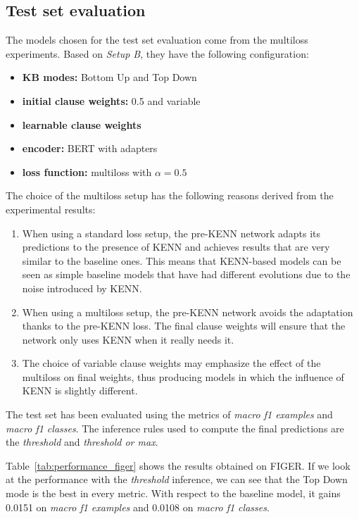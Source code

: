 \subsection{Test set evaluation} \label{test_evaluation}
The models chosen for the test set evaluation come from the multiloss experiments. Based on \textit{Setup B}, they have the following configuration:
\begin{itemize}
    \item \textbf{KB modes:} Bottom Up and Top Down
    \item \textbf{initial clause weights:} 0.5 and variable
    \item \textbf{learnable clause weights}
    \item \textbf{encoder:} BERT with adapters
    \item \textbf{loss function:} multiloss with $\alpha = 0.5$
\end{itemize}
The choice of the multiloss setup has the following reasons derived from the experimental results:
\begin{enumerate}
    \item When using a standard loss setup, the pre-KENN network adapts its predictions to the presence of KENN and achieves results that are very similar to the baseline ones. This means that KENN-based models can be seen as simple baseline models that have had different evolutions due to the noise introduced by KENN.
    \item When using a multiloss setup, the pre-KENN network avoids the adaptation thanks to the pre-KENN loss. The final clause weights will ensure that the network only uses KENN when it really needs it.
    \item The choice of variable clause weights may emphasize the effect of the multiloss on final weights, thus producing models in which the influence of KENN is slightly different.
\end{enumerate}
The test set has been evaluated using the metrics of \textit{macro f1 examples} and \textit{macro f1 classes}. The inference rules used to compute the final predictions are the \textit{threshold} and \textit{threshold or max}.

Table~\ref{tab:performance_figer} shows the results obtained on FIGER. If we look at the performance with the \textit{threshold} inference, we can see that the Top Down mode is the best in every metric. With respect to the baseline model, it gains 0.0151 on \textit{macro f1 examples} and 0.0108 on \textit{macro f1 classes}. 

